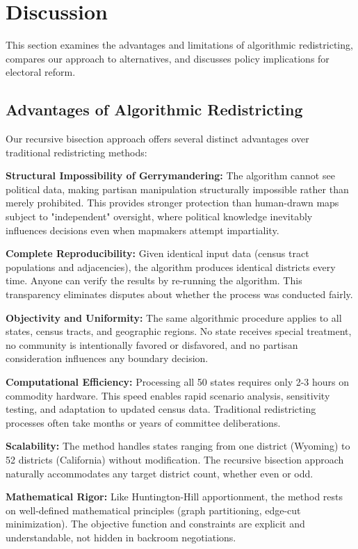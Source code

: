 \section{Discussion}
\label{sec:discussion}

This section examines the advantages and limitations of algorithmic redistricting, compares our approach to alternatives, and discusses policy implications for electoral reform.
\subsection{Advantages of Algorithmic Redistricting}

Our recursive bisection approach offers several distinct advantages over traditional redistricting methods:

\textbf{Structural Impossibility of Gerrymandering:} The algorithm cannot see political data, making partisan manipulation structurally impossible rather than merely prohibited. This provides stronger protection than human-drawn maps subject to "independent" oversight, where political knowledge inevitably influences decisions even when mapmakers attempt impartiality.

\textbf{Complete Reproducibility:} Given identical input data (census tract populations and adjacencies), the algorithm produces identical districts every time. Anyone can verify the results by re-running the algorithm. This transparency eliminates disputes about whether the process was conducted fairly.

\textbf{Objectivity and Uniformity:} The same algorithmic procedure applies to all states, census tracts, and geographic regions. No state receives special treatment, no community is intentionally favored or disfavored, and no partisan consideration influences any boundary decision.

\textbf{Computational Efficiency:} Processing all 50 states requires only 2-3 hours on commodity hardware. This speed enables rapid scenario analysis, sensitivity testing, and adaptation to updated census data. Traditional redistricting processes often take months or years of committee deliberations.

\textbf{Scalability:} The method handles states ranging from one district (Wyoming) to 52 districts (California) without modification. The recursive bisection approach naturally accommodates any target district count, whether even or odd.

\textbf{Mathematical Rigor:} Like Huntington-Hill apportionment, the method rests on well-defined mathematical principles (graph partitioning, edge-cut minimization). The objective function and constraints are explicit and understandable, not hidden in backroom negotiations.

